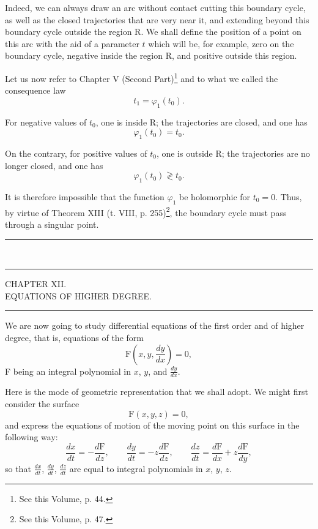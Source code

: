 \documentclass[11pt]{article}
\newcommand{\ornament}{\begin{center}\rule{2.5em}{0.4pt}\,\raisebox{0.1ex}{\tiny$\bullet\bullet\bullet$}\,\rule{2.5em}{0.4pt}\end{center}}
\newcommand{\shortline}{\begin{center}\rule{3.5em}{0.4pt}\end{center}}
\begin{document}
Indeed, we can always draw an arc without contact cutting this boundary cycle, as well as the closed trajectories that are very near it, and extending beyond this boundary cycle outside the region R. We shall define the position of a point on this arc with the aid of a parameter $t$ which will be, for example, zero on the boundary cycle, negative inside the region R, and positive outside this region.

Let us now refer to Chapter V (Second Part)\footnote{See this Volume, p. 44.} and to what we called the consequence law
\[
t_1=\varphi_1(t_0).
\]

For negative values of $t_0$, one is inside R; the trajectories are closed, and one has
\[
\varphi_1(t_0)=t_0.
\]

On the contrary, for positive values of $t_0$, one is outside R; the trajectories are no longer closed, and one has
\[
\varphi_1(t_0)\gtrless t_0.
\]

It is therefore impossible that the function $\varphi_1$ be holomorphic for $t_0=0$. Thus, by virtue of Theorem XIII (t. VIII, p. 255)\footnote{See this Volume, p. 47.}, the boundary cycle must pass through a singular point.

\ornament

\begin{center}
{\large CHAPTER XII.}\\[0.4em]
{\small EQUATIONS OF HIGHER DEGREE.}
\end{center}
\shortline

We are now going to study differential equations of the first order and of higher degree, that is, equations of the form
\begin{equation}\tag{1}
\mathrm{F}\left(x,y,\frac{dy}{dx}\right)=0,
\end{equation}
F being an integral polynomial in $x$, $y$, and $\frac{dy}{dx}$.

Here is the mode of geometric representation that we shall adopt. We might first consider the surface
\begin{equation}\tag{2}
\mathrm{F}(x,y,z)=0,
\end{equation}
and express the equations of motion of the moving point on this surface in the following way:
\begin{equation}\tag{2 bis}
\frac{dx}{dt}=-\frac{d\mathrm{F}}{dz},\qquad
\frac{dy}{dt}=-z\frac{d\mathrm{F}}{dz},\qquad
\frac{dz}{dt}=\frac{d\mathrm{F}}{dx}+z\frac{d\mathrm{F}}{dy},
\end{equation}
so that $\frac{dx}{dt}$, $\frac{dy}{dt}$, $\frac{dz}{dt}$ are equal to integral polynomials in $x$, $y$, $z$.
\end{document}
